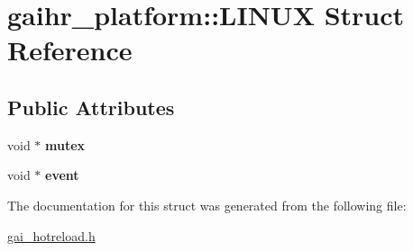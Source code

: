 \hypertarget{structgaihr__platform_1_1_l_i_n_u_x}{}\section{gaihr\+\_\+platform\+:\+:L\+I\+N\+UX Struct Reference}
\label{structgaihr__platform_1_1_l_i_n_u_x}
\subsection*{Public Attributes}
\begin{DoxyCompactItemize}
\item 
\mbox{\label{structgaihr__platform_1_1_l_i_n_u_x_aed2c3b9f8b127fa71b58eb37fcdc3431}} 
void $\ast$ {\bfseries mutex}
\item 
\mbox{\label{structgaihr__platform_1_1_l_i_n_u_x_a247390c0c1511c20b3af596718819e45}} 
void $\ast$ {\bfseries event}
\end{DoxyCompactItemize}


The documentation for this struct was generated from the following file\+:\begin{DoxyCompactItemize}
\item 
\hyperlink{gai__hotreload_8h}{gai\+\_\+hotreload.\+h}\end{DoxyCompactItemize}
